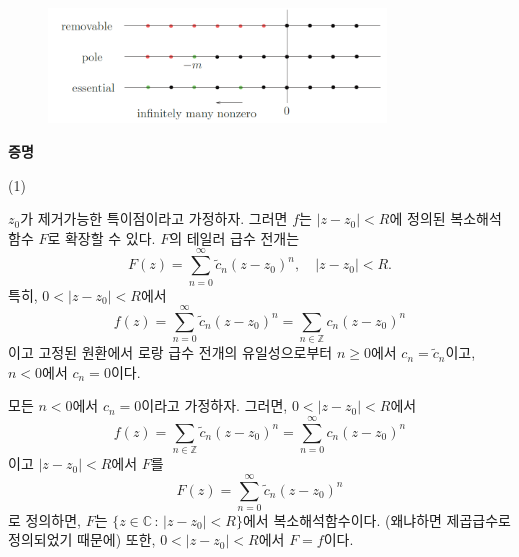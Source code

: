 \begin{figure}[h!]
\begin{center}
\includegraphics[width=0.8\textwidth]{./SaltChapter/fig-4-0-8}
\end{center}
\end{figure}

{\bf 증명}

(1) 

$z_0$가 제거가능한 특이점이라고 가정하자.
그러면 $f$는 $|z-z_0|<R$에 정의된 복소해석함수 $F$로 확장할 수 있다.
$F$의 테일러 급수 전개는
\[
F(z) = \sum_{n=0}^\infty  \tilde c_n (z-z_0)^n,\quad
|z-z_0| <R.
\]
특히, $0<|z-z_0| <R$에서
\[
f(z) = \sum_{n=0}^\infty  \tilde c_n (z-z_0)^n 
= \sum_{n\in\mathbb Z} c_n(z-z_0)^n
\]
이고 고정된 원환에서 로랑 급수 전개의 유일성으로부터
$n\ge0$에서 $c_n = \tilde c_n$이고,
$n<0$에서 $c_n=0$이다.


모든 $n<0$에서 $c_n=0$이라고 가정하자. 그러면,
$0<|z-z_0|<R$에서
\[
f(z) = \sum_{n\in\mathbb Z} \tilde c_n (z-z_0)^n
= \sum_{n=0}^\infty  c_n (z-z_0)^n
\]
이고 $|z-z_0|<R$에서 $F$를
\[
F(z) = \sum_{n=0}^\infty  \tilde c_n (z-z_0)^n
\]
로 정의하면, $F$는 
$\{ z\in\mathbb C\,:\, |z-z_0|<R\}$에서 복소해석함수이다.
(왜냐하면 제곱급수로 정의되었기 때문에)
또한, $0<|z-z_0|<R$에서 $F=f$이다.

